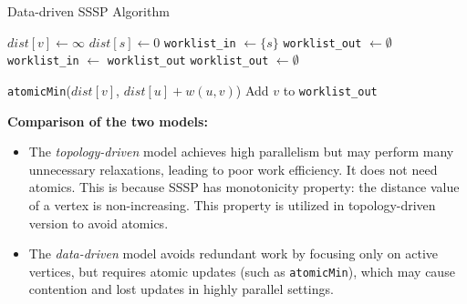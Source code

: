 \documentclass[12pt]{book}
\begin{document}
\begin{itemize}
    \begin{algorithm}[H]
    \caption{Data-driven SSSP Algorithm}
    \label{alg:datadriven}
    \begin{algorithmic}[1]
            \State $dist[v] \gets \infty$
        \EndFor
        \State $dist[s] \gets 0$
        \State \texttt{worklist\_in} $\gets \{s\}$
        \State \texttt{worklist\_out} $\gets \emptyset$
            \State {}
            \State \texttt{worklist\_in} $\gets$ \texttt{worklist\_out}
            \State \texttt{worklist\_out} $\gets \emptyset$
        \EndWhile
    \EndFunction
    
                    \State \texttt{atomicMin}($dist[v]$, $dist[u] + w(u,v)$)
                    \State Add $v$ to \texttt{worklist\_out}
                \EndIf
            \EndFor
        \EndFor
    \EndFunction
    \end{algorithmic}
    \end{algorithm}
\end{itemize}

\noindent
\textbf{Comparison of the two models:}
\begin{itemize}
    \item The \emph{topology-driven} model achieves high parallelism but may perform many unnecessary relaxations, leading to poor work efficiency. It does not need atomics. This is because SSSP has monotonicity property: the distance value of a vertex is non-increasing. This property is utilized in topology-driven version to avoid atomics. 
    \item The \emph{data-driven} model avoids redundant work by focusing only on active vertices, but requires atomic updates (such as \texttt{atomicMin}), which may cause contention and lost updates in highly parallel settings.
\end{itemize}
\end{document}
